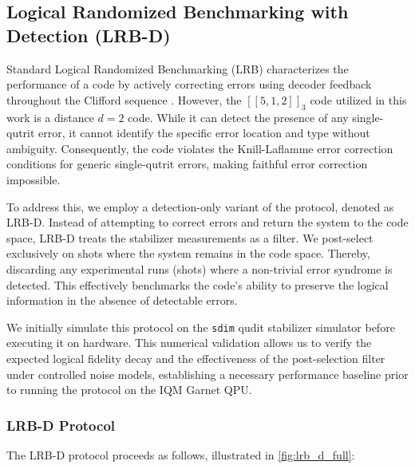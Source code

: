 \subsection{Logical Randomized Benchmarking with Detection (LRB-D)}
\label{sub:lrb_d}

Standard Logical Randomized Benchmarking (LRB) characterizes the performance of a code by actively correcting errors using decoder feedback throughout the Clifford sequence \cite{Combes2017}. However, the $[[5,1,2]]_3$ code utilized in this work is a distance $d=2$ code. While it can detect the presence of any single-qutrit error, it cannot identify the specific error location and type without ambiguity. Consequently, the code violates the Knill-Laflamme error correction conditions for generic single-qutrit errors, making faithful error correction impossible.

To address this, we employ a detection-only variant of the protocol, denoted as LRB-D. Instead of attempting to correct errors and return the system to the code space, LRB-D treats the stabilizer measurements as a filter. We post-select exclusively on shots where the system remains in the code space. Thereby, discarding any experimental runs (shots) where a non-trivial error syndrome is detected. This effectively benchmarks the code's ability to preserve the logical information in the absence of detectable errors.

We initially simulate this protocol on the \texttt{sdim} qudit stabilizer simulator before executing it on hardware. This numerical validation allows us to verify the expected logical fidelity decay and the effectiveness of the post-selection filter under controlled noise models, establishing a necessary performance baseline prior to running the protocol on the IQM Garnet QPU.

\subsubsection{LRB-D Protocol}
The LRB-D protocol proceeds as follows, illustrated in \autoref{fig:lrb_d_full}:

